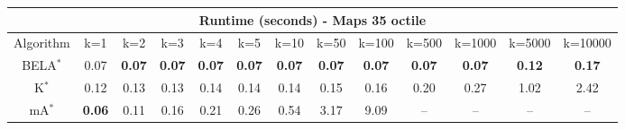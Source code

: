 \begin{tabular}{c|cccccccccccc}\toprule
\multicolumn{13}{c}{Runtime (seconds) - Maps 35 octile}\\ \midrule
Algorithm & k=1 & k=2 & k=3 & k=4 & k=5 & k=10 & k=50 & k=100 & k=500 & k=1000 & k=5000 & k=10000 \\ \midrule
BELA$^*$ & 0.07 & \textbf{0.07} & \textbf{0.07} & \textbf{0.07} & \textbf{0.07} & \textbf{0.07} & \textbf{0.07} & \textbf{0.07} & \textbf{0.07} & \textbf{0.07} & \textbf{0.12} & \textbf{0.17} \\
K$^*$ & 0.12 & 0.13 & 0.13 & 0.14 & 0.14 & 0.14 & 0.15 & 0.16 & 0.20 & 0.27 & 1.02 & 2.42 \\
mA$^*$ & \textbf{0.06} & 0.11 & 0.16 & 0.21 & 0.26 & 0.54 & 3.17 & 9.09 & -- & -- & -- & -- \\ \bottomrule 
\end{tabular}
